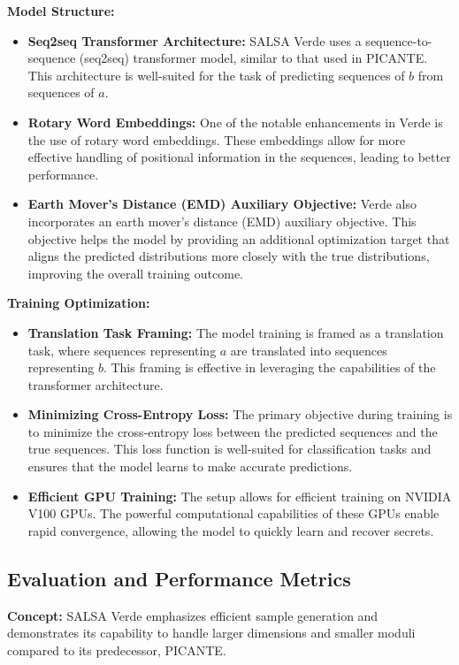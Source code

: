 \documentclass{article}
\begin{document}
\textbf{Model Structure:}
\begin{itemize}
    \item \textbf{Seq2seq Transformer Architecture:} SALSA Verde uses a sequence-to-sequence (seq2seq) transformer model, similar to that used in PICANTE. This architecture is well-suited for the task of predicting sequences of \( b \) from sequences of \( a \).
    \item \textbf{Rotary Word Embeddings:} One of the notable enhancements in Verde is the use of rotary word embeddings. These embeddings allow for more effective handling of positional information in the sequences, leading to better performance.
    \item \textbf{Earth Mover’s Distance (EMD) Auxiliary Objective:} Verde also incorporates an earth mover’s distance (EMD) auxiliary objective. This objective helps the model by providing an additional optimization target that aligns the predicted distributions more closely with the true distributions, improving the overall training outcome.
\end{itemize}

\textbf{Training Optimization:}
\begin{itemize}
    \item \textbf{Translation Task Framing:} The model training is framed as a translation task, where sequences representing \( a \) are translated into sequences representing \( b \). This framing is effective in leveraging the capabilities of the transformer architecture.
    \item \textbf{Minimizing Cross-Entropy Loss:} The primary objective during training is to minimize the cross-entropy loss between the predicted sequences and the true sequences. This loss function is well-suited for classification tasks and ensures that the model learns to make accurate predictions.
    \item \textbf{Efficient GPU Training:} The setup allows for efficient training on NVIDIA V100 GPUs. The powerful computational capabilities of these GPUs enable rapid convergence, allowing the model to quickly learn and recover secrets.
\end{itemize}

\subsection{Evaluation and Performance Metrics}

\textbf{Concept:} SALSA Verde emphasizes efficient sample generation and demonstrates its capability to handle larger dimensions and smaller moduli compared to its predecessor, PICANTE.
\end{document}
